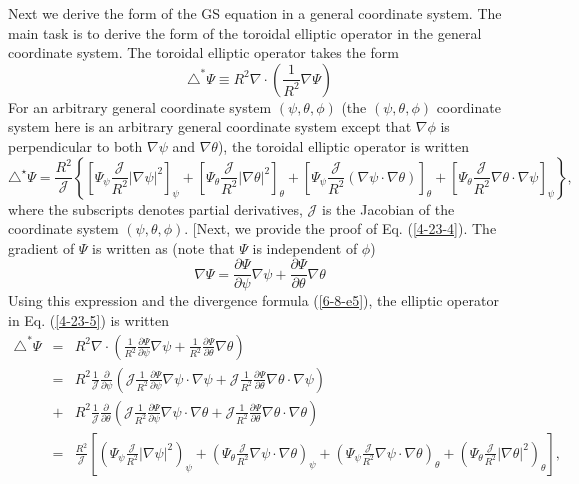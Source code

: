 \documentclass{llncs}
\begin{document}
Next we derive the form of the GS equation in a general coordinate system. The
main task is to derive the form of the toroidal elliptic operator in the
general coordinate system. The toroidal elliptic operator takes the form
\begin{equation}
  \label{4-23-5} \triangle^{\ast} \Psi \equiv R^2 \nabla \cdot \left(
  \frac{1}{R^2} \nabla \Psi \right)
\end{equation}
For an arbitrary general coordinate system $(\psi, \theta, \phi)$ (the $(\psi,
\theta, \phi)$ coordinate system here is an arbitrary general coordinate
system except that $\nabla \phi$ is perpendicular to both $\nabla \psi$ and
$\nabla \theta$), the toroidal elliptic operator is written
\begin{equation}
  \label{4-23-4} \triangle^{\star} \Psi = \frac{R^2}{\mathcal{J}} \left\{
  \left[ \Psi_{\psi} \frac{\mathcal{J}}{R^2} | \nabla \psi |^2 \right]_{\psi}
  + \left[ \Psi_{\theta} \frac{\mathcal{J}}{R^2} | \nabla \theta |^2
  \right]_{\theta} + \left[ \Psi_{\psi} \frac{\mathcal{J}}{R^2} (\nabla \psi
  \cdot \nabla \theta) \right]_{\theta} + \left[ \Psi_{\theta}
  \frac{\mathcal{J}}{R^2} \nabla \theta \cdot \nabla \psi \right]_{\psi}
  \right\},
\end{equation}
where the subscripts denotes partial derivatives, $\mathcal{J}$ is the
Jacobian of the coordinate system $(\psi, \theta, \phi)$. [Next, we provide
the proof of Eq. (\ref{4-23-4}). The gradient of $\Psi$ is written as (note
that $\Psi$ is independent of $\phi$)
\begin{equation}
  \label{4-23-1} \nabla \Psi = \frac{\partial \Psi}{\partial \psi} \nabla \psi
  + \frac{\partial \Psi}{\partial \theta} \nabla \theta
\end{equation}
Using this expression and the divergence formula (\ref{6-8-e5}), the elliptic
operator in Eq. (\ref{4-23-5}) is written
\begin{eqnarray}
  \triangle^{\ast} \Psi & = & R^2 \nabla \cdot \left( \frac{1}{R^2}
  \frac{\partial \Psi}{\partial \psi} \nabla \psi + \frac{1}{R^2}
  \frac{\partial \Psi}{\partial \theta} \nabla \theta \right) \nonumber\\
  & = & R^2 \frac{1}{\mathcal{J}} \frac{\partial}{\partial \psi} \left(
  \mathcal{J} \frac{1}{R^2} \frac{\partial \Psi}{\partial \psi} \nabla \psi
  \cdot \nabla \psi + \mathcal{J} \frac{1}{R^2} \frac{\partial \Psi}{\partial
  \theta} \nabla \theta \cdot \nabla \psi \right) \nonumber\\
  & + & R^2 \frac{1}{\mathcal{J}} \frac{\partial}{\partial \theta} \left(
  \mathcal{J} \frac{1}{R^2} \frac{\partial \Psi}{\partial \psi} \nabla \psi
  \cdot \nabla \theta + \mathcal{J} \frac{1}{R^2} \frac{\partial
  \Psi}{\partial \theta} \nabla \theta \cdot \nabla \theta \right) \nonumber\\
  & = & \frac{R^2}{\mathcal{J}} \left[ \left( \Psi_{\psi}
  \frac{\mathcal{J}}{R^2} | \nabla \psi |^2 \right)_{\psi} + \left(
  \Psi_{\theta} \frac{\mathcal{J}}{R^2} \nabla \psi \cdot \nabla \theta
  \right)_{\psi} + \left( \Psi_{\psi} \frac{\mathcal{J}}{R^2} \nabla \psi
  \cdot \nabla \theta \right)_{\theta} + \left( \Psi_{\theta}
  \frac{\mathcal{J}}{R^2} | \nabla \theta |^2 \right)_{\theta} \right], 
\end{eqnarray}
\end{document}
